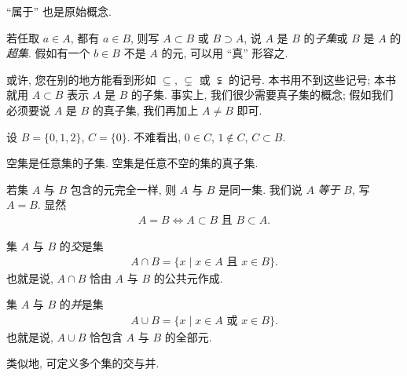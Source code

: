 \begin{remark}
    ``属于'' 也是原始概念.
\end{remark}

\begin{definition}
    若任取 $a \in A$, 都有 $a \in B$, 则写 $A \subset B$ 或 $B \supset A$, 说 $A$ 是 $B$ 的\emph{子集}或 $B$ 是 $A$ 的\emph{超集}. 假如有一个 $b \in B$ 不是 $A$ 的元, 可以用 ``真'' 形容之.
\end{definition}

\begin{remark}
    或许, 您在别的地方能看到形如 $\subseteq$, $\subsetneq$ 或 $\subsetneqq$ 的记号. 本书用不到这些记号; 本书就用 $A \subset B$ 表示 $A$ 是 $B$ 的子集. 事实上, 我们很少需要真子集的概念; 假如我们必须要说 $A$ 是 $B$ 的真子集, 我们再加上 $A \neq B$ 即可.
\end{remark}

\begin{example}
    设 $B = \{ 0,1,2 \}$, $C = \{ 0 \}$. 不难看出, $0 \in C$, $1 \notin C$, $C \subset B$.
\end{example}

\begin{remark}
    空集是任意集的子集. 空集是任意不空的集的真子集.
\end{remark}

\begin{definition}
    若集 $A$ 与 $B$ 包含的元完全一样, 则 $A$ 与 $B$ 是同一集. 我们说 $A$ \emph{等于} $B$, 写 $A = B$. 显然
    \begin{align*}
        A = B \iff \text{$A \subset B$ 且 $B \subset A$}.
    \end{align*}
\end{definition}

\begin{definition}
    集 $A$ 与 $B$ 的\emph{交}是集
    \begin{align*}
        A \cap B = \{ x \mid \text{$x \in A$ 且 $x \in B$} \}.
    \end{align*}
    也就是说, $A \cap B$ 恰由 $A$ 与 $B$ 的公共元作成.

    集 $A$ 与 $B$ 的\emph{并}是集
    \begin{align*}
        A \cup B = \{ x \mid \text{$x \in A$ 或 $x \in B$} \}.
    \end{align*}
    也就是说, $A \cup B$ 恰包含 $A$ 与 $B$ 的全部元.

    类似地, 可定义多个集的交与并.
\end{definition}

